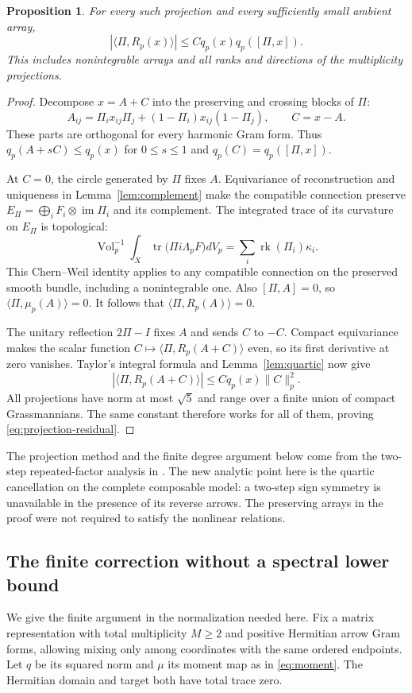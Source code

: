 \documentclass[11pt]{amsart}
\newtheorem{proposition}[theorem]{Proposition}
\theoremstyle{definition}
\theoremstyle{remark}
\newcommand{\tr}{\operatorname{tr}}
\newcommand{\rk}{\operatorname{rk}}
\newcommand{\Vol}{\operatorname{Vol}}
\newcommand{\im}{\operatorname{im}}
\begin{document}
\begin{proposition}\label{prop:projection-residual}
For every such projection and every sufficiently small ambient array,
\begin{equation}\label{eq:projection-residual}
 |\langle\Pi,R_p(x)\rangle|
 \le Cq_p(x)q_p([\Pi,x]).
\end{equation}
This includes nonintegrable arrays and all ranks and directions of
the multiplicity projections.
\end{proposition}
\begin{proof}
Decompose $x=A+C$ into the preserving and crossing blocks of $\Pi$:
\[
 A_{ij}=\Pi_ix_{ij}\Pi_j+(1-\Pi_i)x_{ij}(1-\Pi_j),\qquad C=x-A.
\]
These parts are orthogonal for every harmonic Gram form. Thus
$q_p(A+sC)\le q_p(x)$ for $0\le s\le1$ and
$q_p(C)=q_p([\Pi,x])$.

At $C=0$, the circle generated by $\Pi$ fixes $A$. Equivariance
of reconstruction and uniqueness in Lemma~\ref{lem:complement}
make the compatible connection preserve
$E_\Pi=\bigoplus_iF_i\otimes\im\Pi_i$ and its complement.
The integrated trace of its curvature on $E_\Pi$ is topological:
\[
 \Vol_p^{-1}\int_X\tr\bigl(\Pi i\Lambda_pF\bigr)dV_p
 =\sum_i\rk(\Pi_i)\kappa_i.
\]
This Chern--Weil identity applies to any compatible connection on
the preserved smooth bundle, including a nonintegrable one.
Also $[\Pi,A]=0$, so $\langle\Pi,\mu_p(A)\rangle=0$.
It follows that $\langle\Pi,R_p(A)\rangle=0$.

The unitary reflection $2\Pi-I$ fixes $A$ and sends $C$ to $-C$.
Compact equivariance makes the scalar function
$C\mapsto\langle\Pi,R_p(A+C)\rangle$ even, so its first derivative
at zero vanishes. Taylor's integral formula and Lemma~\ref{lem:quartic}
now give
\[
 |\langle\Pi,R_p(A+C)\rangle|
 \le Cq_p(x)\|C\|_p^2.
\]
All projections have norm at most $\sqrt5$ and range over a finite
union of compact Grassmannians. The same constant therefore works
for all of them, proving \eqref{eq:projection-residual}.
\end{proof}

The projection method and the finite degree argument below come from
the two-step repeated-factor analysis in \cite{WuebbenRepeated26}.
The new analytic point here is the quartic cancellation on the complete
composable model: a two-step sign symmetry is unavailable in the presence
of its reverse arrows. The preserving arrays in the proof were not
required to satisfy the nonlinear relations.

\subsection{The finite correction without a spectral lower bound}
We give the finite argument in the normalization needed here. Fix a
matrix representation with total multiplicity $M\ge2$ and positive
Hermitian arrow Gram forms, allowing mixing only among coordinates
with the same ordered endpoints. Let $q$ be its squared norm and
$\mu$ its moment map as in \eqref{eq:moment}. The Hermitian domain
and target both have total trace zero.
\end{document}
